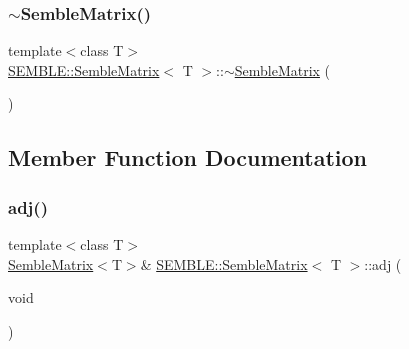 \mbox{\label{structSEMBLE_1_1SembleMatrix_a58bec7f5fd4b0169dfbbb472981e9dee}} 
\subsubsection{\texorpdfstring{$\sim$SembleMatrix()}{~SembleMatrix()}\hspace{0.1cm}{\footnotesize\ttfamily [2/2]}}
{\footnotesize\ttfamily template$<$class T$>$ \\
\mbox{\hyperlink{structSEMBLE_1_1SembleMatrix}{S\+E\+M\+B\+L\+E\+::\+Semble\+Matrix}}$<$ T $>$\+::$\sim$\mbox{\hyperlink{structSEMBLE_1_1SembleMatrix}{Semble\+Matrix}} (\begin{DoxyParamCaption}{ }\end{DoxyParamCaption})\hspace{0.3cm}{\ttfamily [inline]}}



\subsection{Member Function Documentation}
\mbox{\label{structSEMBLE_1_1SembleMatrix_a1005b8d94ad7731fe6826fd614203703}} 
\subsubsection{\texorpdfstring{adj()}{adj()}\hspace{0.1cm}{\footnotesize\ttfamily [1/2]}}
{\footnotesize\ttfamily template$<$class T$>$ \\
\mbox{\hyperlink{structSEMBLE_1_1SembleMatrix}{Semble\+Matrix}}$<$T$>$\& \mbox{\hyperlink{structSEMBLE_1_1SembleMatrix}{S\+E\+M\+B\+L\+E\+::\+Semble\+Matrix}}$<$ T $>$\+::adj (\begin{DoxyParamCaption}\item[{void}]{ }\end{DoxyParamCaption})\hspace{0.3cm}{\ttfamily [inline]}}

